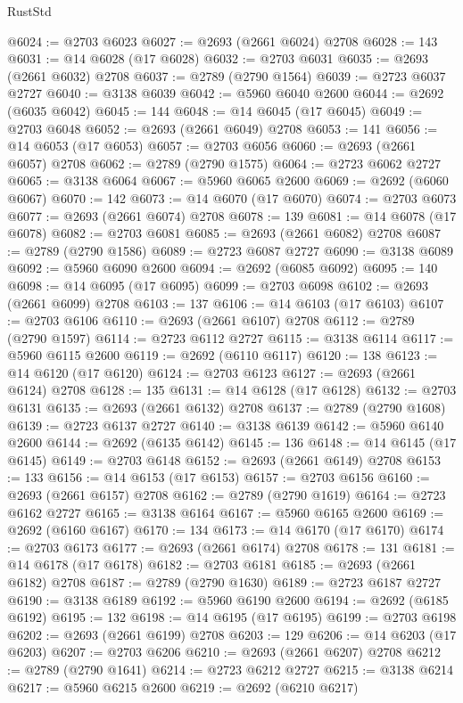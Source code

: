 \begin{lexlean}{RustStd}
\begin{coremodule}
@6024 := @2703 @6023
@6027 := @2693 (@2661 @6024) @2708
@6028 := 143
@6031 := @14 @6028 (@17 @6028)
@6032 := @2703 @6031
@6035 := @2693 (@2661 @6032) @2708
@6037 := @2789 (@2790 @1564)
@6039 := @2723 @6037 @2727
@6040 := @3138 @6039
@6042 := @5960 @6040 @2600
@6044 := @2692 (@6035 @6042)
@6045 := 144
@6048 := @14 @6045 (@17 @6045)
@6049 := @2703 @6048
@6052 := @2693 (@2661 @6049) @2708
@6053 := 141
@6056 := @14 @6053 (@17 @6053)
@6057 := @2703 @6056
@6060 := @2693 (@2661 @6057) @2708
@6062 := @2789 (@2790 @1575)
@6064 := @2723 @6062 @2727
@6065 := @3138 @6064
@6067 := @5960 @6065 @2600
@6069 := @2692 (@6060 @6067)
@6070 := 142
@6073 := @14 @6070 (@17 @6070)
@6074 := @2703 @6073
@6077 := @2693 (@2661 @6074) @2708
@6078 := 139
@6081 := @14 @6078 (@17 @6078)
@6082 := @2703 @6081
@6085 := @2693 (@2661 @6082) @2708
@6087 := @2789 (@2790 @1586)
@6089 := @2723 @6087 @2727
@6090 := @3138 @6089
@6092 := @5960 @6090 @2600
@6094 := @2692 (@6085 @6092)
@6095 := 140
@6098 := @14 @6095 (@17 @6095)
@6099 := @2703 @6098
@6102 := @2693 (@2661 @6099) @2708
@6103 := 137
@6106 := @14 @6103 (@17 @6103)
@6107 := @2703 @6106
@6110 := @2693 (@2661 @6107) @2708
@6112 := @2789 (@2790 @1597)
@6114 := @2723 @6112 @2727
@6115 := @3138 @6114
@6117 := @5960 @6115 @2600
@6119 := @2692 (@6110 @6117)
@6120 := 138
@6123 := @14 @6120 (@17 @6120)
@6124 := @2703 @6123
@6127 := @2693 (@2661 @6124) @2708
@6128 := 135
@6131 := @14 @6128 (@17 @6128)
@6132 := @2703 @6131
@6135 := @2693 (@2661 @6132) @2708
@6137 := @2789 (@2790 @1608)
@6139 := @2723 @6137 @2727
@6140 := @3138 @6139
@6142 := @5960 @6140 @2600
@6144 := @2692 (@6135 @6142)
@6145 := 136
@6148 := @14 @6145 (@17 @6145)
@6149 := @2703 @6148
@6152 := @2693 (@2661 @6149) @2708
@6153 := 133
@6156 := @14 @6153 (@17 @6153)
@6157 := @2703 @6156
@6160 := @2693 (@2661 @6157) @2708
@6162 := @2789 (@2790 @1619)
@6164 := @2723 @6162 @2727
@6165 := @3138 @6164
@6167 := @5960 @6165 @2600
@6169 := @2692 (@6160 @6167)
@6170 := 134
@6173 := @14 @6170 (@17 @6170)
@6174 := @2703 @6173
@6177 := @2693 (@2661 @6174) @2708
@6178 := 131
@6181 := @14 @6178 (@17 @6178)
@6182 := @2703 @6181
@6185 := @2693 (@2661 @6182) @2708
@6187 := @2789 (@2790 @1630)
@6189 := @2723 @6187 @2727
@6190 := @3138 @6189
@6192 := @5960 @6190 @2600
@6194 := @2692 (@6185 @6192)
@6195 := 132
@6198 := @14 @6195 (@17 @6195)
@6199 := @2703 @6198
@6202 := @2693 (@2661 @6199) @2708
@6203 := 129
@6206 := @14 @6203 (@17 @6203)
@6207 := @2703 @6206
@6210 := @2693 (@2661 @6207) @2708
@6212 := @2789 (@2790 @1641)
@6214 := @2723 @6212 @2727
@6215 := @3138 @6214
@6217 := @5960 @6215 @2600
@6219 := @2692 (@6210 @6217)

\end{coremodule}
\end{lexlean}
